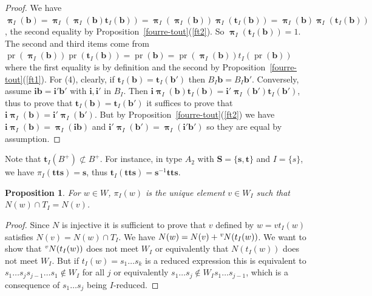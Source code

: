 \documentclass{amsart}
\numberwithin{equation}{section}
\newtheorem{proposition}[equation]{Proposition}
\newcommand\lexp[2]{\kern\scriptspace\vphantom{#2}^{#1}\kern-\scriptspace#2}
\newcommand\inv{^{-1}}
\newcommand\bb{{\mathbf b}}
\newcommand\bi{{\mathbf i}}
\newcommand\bs{{\mathbf s}}
\newcommand\bt{{\mathbf t}}
\newcommand\bS{{\mathbf S}}
\DeclareMathOperator\pr{pr}
\DeclareMathOperator\bpi{\boldsymbol\pi}
\begin{document}
\begin{proof}   We   have   $\bpi_I(\bb)   =  \bpi_I(\bpi_I(\bb)\bt_I(\bb))
=\bpi_I(\bpi_I(\bb))\bpi_I(\bt_I(\bb))   =  \bpi_I(\bb)\bpi_I(\bt_I(\bb))$,
 the  second equality by Proposition~\ref{fourre-tout}(\ref{ft2}).  So $\bpi_I(\bt_I(\bb)) = 1$. The
second and third items come from
$\pr(\bpi_I(\bb))\pr(\bt_I(\bb))=\pr(\bb)=\pr(\bpi_I(\bb))t_I(\pr(\bb))$
where  the first  equality is  by definition  and the second by 
Proposition~\ref{fourre-tout}(\ref{ft1}). For (4), clearly, if $\bt_I(\bb)=\bt_I(\bb')$
then $B_I\bb =
B_I\bb'$. Conversely, assume $\bi \bb = \bi'\bb'$ with $\bi,\bi'$ in $B_I$.
Then  $\bi\bpi_I(\bb)\bt_I(\bb)=\bi'\bpi_I(\bb')\bt_I(\bb')$, thus  to prove
that $\bt_I(\bb)=\bt_I(\bb')$ it suffices to prove that
 $\bi\bpi_I(\bb)=\bi'\bpi_I(\bb')$.   But   by   Proposition~\ref{fourre-tout}(\ref{ft2})  we  have
$\bi\bpi_I(\bb)=\bpi_I(\bi\bb)$  and $\bi'\bpi_I(\bb')=\bpi_I(\bi'\bb')$ so
they are equal by assumption.
\end{proof}
Note that $\bt_I(B^+)\not\subset B^+$. For instance, in type $A_2$ with
$\bS=\{\bs,\bt\}$ and $I=\{s\}$, we have $\pi_I(\bt\bt\bs)=\bs$, thus
$\bt_I(\bt\bt\bs)=\bs\inv\bt\bt\bs$.

\begin{proposition}\label{commute pr}
For $w\in W$, $\pi_I(w)$ is the unique
element $v\in W_I$ such that $N(w)\cap T_I=N(v)$.
\end{proposition}
\begin{proof}Since $N$ is injective it
is  sufficient  to  prove  that  $v$  defined  by $w=vt_I(w)$ satisfies
$N(v)=N(w)\cap  T_I$. We have  $N(w)=N(v) + \lexp  v N(t_I(w))$. We want to
show  that $\lexp  v N(t_I(w))$  does not  meet $W_I$  or equivalently that
$N(t_I(w))$ does not meet $W_I$. But if $t_I(w)=s_1\ldots s_k$ is a reduced
expression  this is  equivalent to  $s_1\ldots s_j  s_{j-1}\ldots s_1\notin
W_I$  for  all  $j$  or  equivalently  $s_1\ldots  s_j\notin  W_I s_1\ldots
s_{j-1}$, which is a consequence of $s_1\ldots s_j$ being $I$-reduced.
\end{proof}
\end{document}
